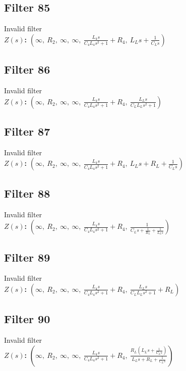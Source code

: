 \documentclass{article}
\begin{document}
\subsection*{Filter 85}
Invalid filter \\ 
\textbf{$Z(s)$:} $\left( \infty, \  R_{2}, \  \infty, \  \infty, \  \frac{L_{4} s}{C_{4} L_{4} s^{2} + 1} + R_{4}, \  L_{L} s + \frac{1}{C_{L} s}\right)$ \\ 
\subsection*{Filter 86}
Invalid filter \\ 
\textbf{$Z(s)$:} $\left( \infty, \  R_{2}, \  \infty, \  \infty, \  \frac{L_{4} s}{C_{4} L_{4} s^{2} + 1} + R_{4}, \  \frac{L_{L} s}{C_{L} L_{L} s^{2} + 1}\right)$ \\ 
\subsection*{Filter 87}
Invalid filter \\ 
\textbf{$Z(s)$:} $\left( \infty, \  R_{2}, \  \infty, \  \infty, \  \frac{L_{4} s}{C_{4} L_{4} s^{2} + 1} + R_{4}, \  L_{L} s + R_{L} + \frac{1}{C_{L} s}\right)$ \\ 
\subsection*{Filter 88}
Invalid filter \\ 
\textbf{$Z(s)$:} $\left( \infty, \  R_{2}, \  \infty, \  \infty, \  \frac{L_{4} s}{C_{4} L_{4} s^{2} + 1} + R_{4}, \  \frac{1}{C_{L} s + \frac{1}{R_{L}} + \frac{1}{L_{L} s}}\right)$ \\ 
\subsection*{Filter 89}
Invalid filter \\ 
\textbf{$Z(s)$:} $\left( \infty, \  R_{2}, \  \infty, \  \infty, \  \frac{L_{4} s}{C_{4} L_{4} s^{2} + 1} + R_{4}, \  \frac{L_{L} s}{C_{L} L_{L} s^{2} + 1} + R_{L}\right)$ \\ 
\subsection*{Filter 90}
Invalid filter \\ 
\textbf{$Z(s)$:} $\left( \infty, \  R_{2}, \  \infty, \  \infty, \  \frac{L_{4} s}{C_{4} L_{4} s^{2} + 1} + R_{4}, \  \frac{R_{L} \left(L_{L} s + \frac{1}{C_{L} s}\right)}{L_{L} s + R_{L} + \frac{1}{C_{L} s}}\right)$ \\ 
\end{document}
